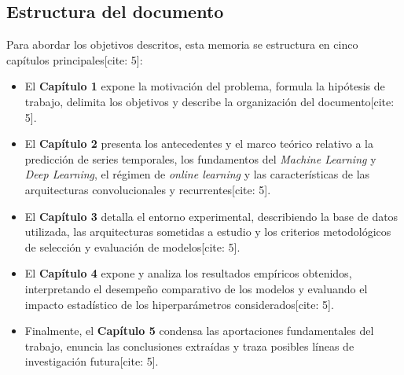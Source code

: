 \subsection{Estructura del documento}
\label{sec:estructura}
Para abordar los objetivos descritos, esta memoria se estructura en cinco capítulos principales[cite: 5]:
\begin{itemize}
	\item El \textbf{Capítulo 1} expone la motivación del problema, formula la hipótesis de trabajo, delimita los objetivos y describe la organización del documento[cite: 5].
	\item El \textbf{Capítulo 2} presenta los antecedentes y el marco teórico relativo a la predicción de series temporales, los fundamentos del \textit{Machine Learning} y \textit{Deep Learning}, el régimen de \textit{online learning} y las características de las arquitecturas convolucionales y recurrentes[cite: 5].
	\item El \textbf{Capítulo 3} detalla el entorno experimental, describiendo la base de datos utilizada, las arquitecturas sometidas a estudio y los criterios metodológicos de selección y evaluación de modelos[cite: 5].
	\item El \textbf{Capítulo 4} expone y analiza los resultados empíricos obtenidos, interpretando el desempeño comparativo de los modelos y evaluando el impacto estadístico de los hiperparámetros considerados[cite: 5].
	\item Finalmente, el \textbf{Capítulo 5} condensa las aportaciones fundamentales del trabajo, enuncia las conclusiones extraídas y traza posibles líneas de investigación futura[cite: 5].
\end{itemize}